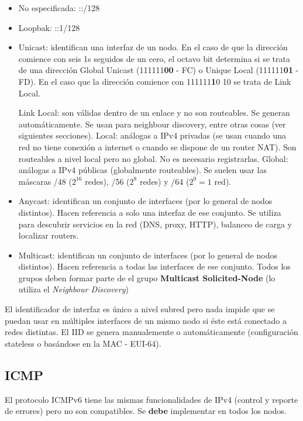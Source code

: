 \documentclass{book}
\begin{document}
	\begin{itemize}
		\item No especificada: ::/128 
		\item Loopbak: ::1/128
		\item Unicast: identifican una interfaz de un nodo. En el caso de que la dirección comience con seis 1s seguidos de un cero, el octavo bit determina si se trata de una dirección Global Unicast (111111\textbf{00} - FC) o Unique Local (111111\textbf{01} - FD). En el caso que la dirección comience con 111111\textbf{1}0 10 se trata de Link Local.
		
		\subitem* Link Local: son válidas dentro de un enlace y no son routeables. Se generan automáticamente. Se usan para neighbour discovery, entre otras cosas (ver siguientes secciones).
		\subitem* [Unique] Local: análogas a IPv4 privadas (se usan cuando una red no tiene conexión a internet o cuando se dispone de un router NAT). Son routeables a nivel local pero no global. No es necesario registrarlas.
		\subitem* Global: análogas a IPv4 públicas (globalmente routeables). Se suelen usar las máscaras /48 ($2^{16}$ redes), /56 ($2^{8}$ redes) y /64 ($2^{0} = 1$ red).
		
		\item Anycast: identifican un conjunto de interfaces (por lo general de nodos distintos). Hacen referencia a solo una interfaz de ese conjunto. Se utiliza para descubrir servicios en la red (DNS, proxy, HTTP), balanceo de carga y localizar routers.
		\item Multicast: identifican un conjunto de interfaces (por lo general de nodos distintos). Hacen referencia a todas las interfaces de ese conjunto. Todos los grupos deben formar parte de el grupo \textbf{Multicast Solicited-Node} (lo utiliza el \textit{Neighbour Discovery})
	\end{itemize}
	
	El identificador de interfaz es único a nivel subred pero nada impide que se puedan usar en múltiples interfaces de un mismo nodo si éste está conectado a redes distintas. El IID se genera manualemente o automáticamente (configuración stateless o basándose en la MAC - EUI-64).
	
	\subsection{ICMP}
	El protocolo ICMPv6 tiene las mismas funcionalidades de IPv4 (control y reporte de errores) pero no son compatibles. Se \textbf{debe} implementar en todos los nodos.
	
\end{document}

